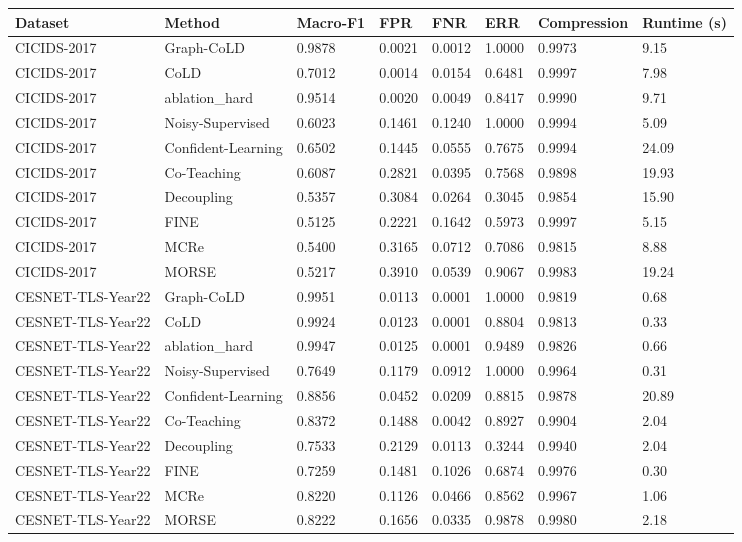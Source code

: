 \small
\begin{tabular}{llllllll}
\hline
Dataset & Method & Macro-F1 & FPR & FNR & ERR & Compression & Runtime (s) \\
\hline
CICIDS-2017 & Graph-CoLD & 0.9878 & 0.0021 & 0.0012 & 1.0000 & 0.9973 & 9.15 \\
CICIDS-2017 & CoLD & 0.7012 & 0.0014 & 0.0154 & 0.6481 & 0.9997 & 7.98 \\
CICIDS-2017 & ablation\_hard & 0.9514 & 0.0020 & 0.0049 & 0.8417 & 0.9990 & 9.71 \\
CICIDS-2017 & Noisy-Supervised & 0.6023 & 0.1461 & 0.1240 & 1.0000 & 0.9994 & 5.09 \\
CICIDS-2017 & Confident-Learning & 0.6502 & 0.1445 & 0.0555 & 0.7675 & 0.9994 & 24.09 \\
CICIDS-2017 & Co-Teaching & 0.6087 & 0.2821 & 0.0395 & 0.7568 & 0.9898 & 19.93 \\
CICIDS-2017 & Decoupling & 0.5357 & 0.3084 & 0.0264 & 0.3045 & 0.9854 & 15.90 \\
CICIDS-2017 & FINE & 0.5125 & 0.2221 & 0.1642 & 0.5973 & 0.9997 & 5.15 \\
CICIDS-2017 & MCRe & 0.5400 & 0.3165 & 0.0712 & 0.7086 & 0.9815 & 8.88 \\
CICIDS-2017 & MORSE & 0.5217 & 0.3910 & 0.0539 & 0.9067 & 0.9983 & 19.24 \\
CESNET-TLS-Year22 & Graph-CoLD & 0.9951 & 0.0113 & 0.0001 & 1.0000 & 0.9819 & 0.68 \\
CESNET-TLS-Year22 & CoLD & 0.9924 & 0.0123 & 0.0001 & 0.8804 & 0.9813 & 0.33 \\
CESNET-TLS-Year22 & ablation\_hard & 0.9947 & 0.0125 & 0.0001 & 0.9489 & 0.9826 & 0.66 \\
CESNET-TLS-Year22 & Noisy-Supervised & 0.7649 & 0.1179 & 0.0912 & 1.0000 & 0.9964 & 0.31 \\
CESNET-TLS-Year22 & Confident-Learning & 0.8856 & 0.0452 & 0.0209 & 0.8815 & 0.9878 & 20.89 \\
CESNET-TLS-Year22 & Co-Teaching & 0.8372 & 0.1488 & 0.0042 & 0.8927 & 0.9904 & 2.04 \\
CESNET-TLS-Year22 & Decoupling & 0.7533 & 0.2129 & 0.0113 & 0.3244 & 0.9940 & 2.04 \\
CESNET-TLS-Year22 & FINE & 0.7259 & 0.1481 & 0.1026 & 0.6874 & 0.9976 & 0.30 \\
CESNET-TLS-Year22 & MCRe & 0.8220 & 0.1126 & 0.0466 & 0.8562 & 0.9967 & 1.06 \\
CESNET-TLS-Year22 & MORSE & 0.8222 & 0.1656 & 0.0335 & 0.9878 & 0.9980 & 2.18 \\
\hline
\end{tabular}
